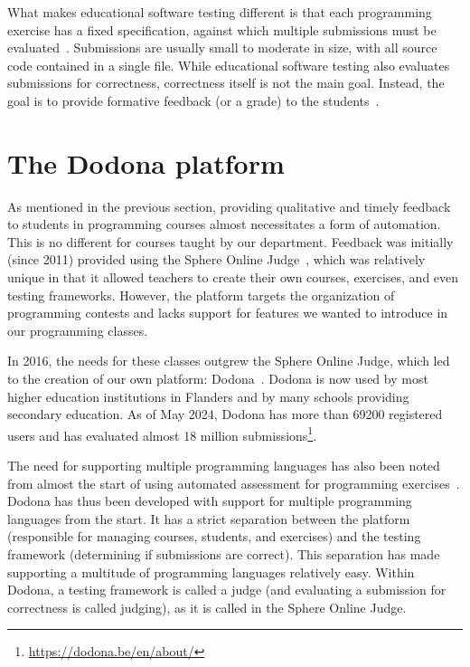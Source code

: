 \documentclass[../main]{subfiles}
\begin{document}
What makes educational software testing different is that each programming exercise has a fixed specification, against which multiple submissions must be evaluated~\autocite{wilcoxTestingStrategiesAutomated2016}.
Submissions are usually small to moderate in size, with all source code contained in a single file.
While educational software testing also evaluates submissions for correctness, correctness itself is not the main goal.
Instead, the goal is to provide formative feedback (or a grade) to the students~\autocite{caizaProgrammingAssignmentsAutomatic2013}.

\section{The Dodona platform}\label{sec:dodona}

As mentioned in the previous section, providing qualitative and timely feedback to students in programming courses almost necessitates a form of automation.
This is no different for courses taught by our department.
Feedback was initially (since 2011) provided using the Sphere Online Judge~\autocite{kosowskiApplicationOnlineJudge2008}, which was relatively unique in that it allowed teachers to create their own courses, exercises, and even testing frameworks.
However, the platform targets the organization of programming contests and lacks support for features we wanted to introduce in our programming classes.

In 2016, the needs for these classes outgrew the Sphere Online Judge, which led to the creation of our own platform: Dodona~\autocite{vanpetegemDodonaLearnCode2023}.
Dodona is now used by most higher education institutions in Flanders and by many schools providing secondary education.
As of May 2024, Dodona has more than \num{69200} registered users and has evaluated almost 18 million submissions\footnote{\url{https://dodona.be/en/about/}}.

The need for supporting multiple programming languages has also been noted from almost the start of using automated assessment for programming exercises~\autocite{hextAutomaticGradingScheme1969}.
Dodona has thus been developed with support for multiple programming languages from the start.
It has a strict separation between the platform (responsible for managing courses, students, and exercises) and the testing framework (determining if submissions are correct).
This separation has made supporting a multitude of programming languages relatively easy.
Within Dodona, a testing framework is called a judge (and evaluating a submission for correctness is called judging), as it is called in the Sphere Online Judge.
\end{document}
